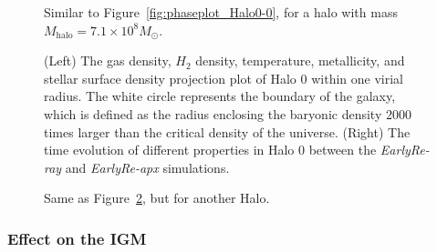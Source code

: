 \documentclass[linenumbers, twocolumn]{aastex631}
\begin{document}
\begin{figure}
    \caption{Similar to Figure~\ref{fig:phaseplot_Halo0-0}, for a halo with mass $M_{\mathrm{halo}} = 7.1\times 10^{8} M_\odot$.}
    \label{fig:phaseplot_Halo18-19}
\end{figure}

\begin{figure}
    \caption{(Left) The gas density, $H_{2}$ density, temperature, metallicity, and stellar surface density projection plot of Halo 0 within one virial radius. The white circle represents the boundary of the galaxy, which is defined as the radius enclosing the baryonic density 2000 times larger than the critical density of the universe. (Right) The time evolution of different properties in Halo 0 between the \textit{EarlyRe-ray} and \textit{EarlyRe-apx} simulations.}
    \label{fig:Halo0-0_comparison}
\end{figure}

\begin{figure}
    \caption{Same as Figure~\ref{fig:Halo0-0_comparison}, but for another Halo.}
    \label{fig:Halo3-3_comparison}
\end{figure}


\subsubsection{Effect on the IGM}
\end{document}
